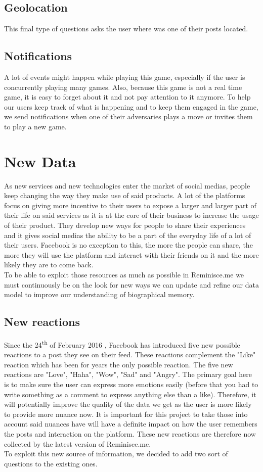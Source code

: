 \subsection{Geolocation}
This final type of questions asks the user where was one of their posts located.

\subsection{Notifications}
A lot of events might happen while playing this game, especially if the user is concurrently playing many games. Also, because this game is not a real time game, it is easy to forget about it and not pay attention to it anymore. To help our users keep track of what is happening and to keep them engaged in the game, we send notifications when one of their adversaries plays a move or invites them to play a new game.

\section{New Data}
As new services and new technologies enter the market of social medias, people keep changing the way they make use of said products. A lot of the platforms focus on giving more incentive to their users to expose a larger and larger part of their life on said services as it is at the core of their business to increase the usage of their product. They develop new ways for people to share their experiences and it gives social medias the ability to be a part of the everyday life of a lot of their users. Facebook is no exception to this, the more the people can share, the more they will use the platform and interact with their friends on it and the more likely they are to come back.\\To be able to exploit those resources as much as possible in Reminisce.me we must continuously be on the look for new ways we can update and refine our data model to improve our understanding of biographical memory.
\subsection{New reactions}\label{subsec:newreacts}
Since the 24\textsuperscript{th} of February 2016 \cite{reactrelease}, Facebook has introduced five new possible reactions to a post they see on their feed. These reactions complement the "Like" reaction which has been for years the only possible reaction. The five new reactions are "Love", "Haha", "Wow", "Sad" and "Angry". The primary goal here is to make sure the user can express more emotions easily (before that you had to write something as a comment to express anything else than  a like). Therefore, it will potentially improve the quality of the data we get as the user is more likely to provide more nuance now. It is important for this project to take those into account said nuances have will have a definite impact on how the user remembers the posts and interaction on the platform. These new reactions are therefore now collected by the latest version of Reminisce.me.\\
To exploit this new source of information, we decided to add two sort of questions to the existing ones.
